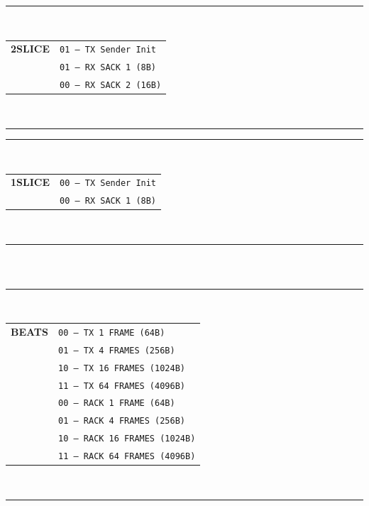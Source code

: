 \documentclass[../../../OAE-SPEC-MAIN.tex]{subfiles}
\begin{document}
\begin{margintable}
  \footnotesize
  \rule{5.4cm}{0.8pt}\\
  \begin{tabular}{@{}cl@{}}
    \textbf{2SLICE} & \texttt{01 — TX Sender Init} \\
                   & \texttt{01 — RX SACK 1 (8B)} \\
                   & \texttt{00 — RX SACK 2 (16B)} \\
  \end{tabular}\\
  \rule{5.4cm}{0.6pt}
\end{margintable}

\begin{margintable}
  \footnotesize
  \rule{5.4cm}{0.8pt}\\
  \begin{tabular}{@{}cl@{}}
    \textbf{1SLICE} & \texttt{00 — TX Sender Init} \\
                   & \texttt{00 — RX SACK 1 (8B)} \\
  \end{tabular}\\
  \rule{5.4cm}{0.6pt}
\end{margintable}

\begin{margintable} %
  \footnotesize
  \begin{tabular}{@{}cl@{}}
  \end{tabular}\\
\end{margintable}

\begin{margintable}
  \footnotesize
  \rule{5.4cm}{0.8pt}\\
  \begin{tabular}{@{}cl@{}}
    \textbf{BEATS} & \texttt{00 — TX 1 FRAME (64B)} \\
                   & \texttt{01 — TX 4 FRAMES (256B)} \\
                   & \texttt{10 — TX 16 FRAMES (1024B)} \\
                   & \texttt{11 — TX 64 FRAMES (4096B)} \\[3pt]
                   & \texttt{00 — RACK 1 FRAME (64B)} \\
                   & \texttt{01 — RACK 4 FRAMES (256B)} \\
                   & \texttt{10 — RACK 16 FRAMES (1024B)} \\
                   & \texttt{11 — RACK 64 FRAMES (4096B)} \\
  \end{tabular}\\
  \rule{5.4cm}{0.6pt}
\end{margintable}
\end{document}
